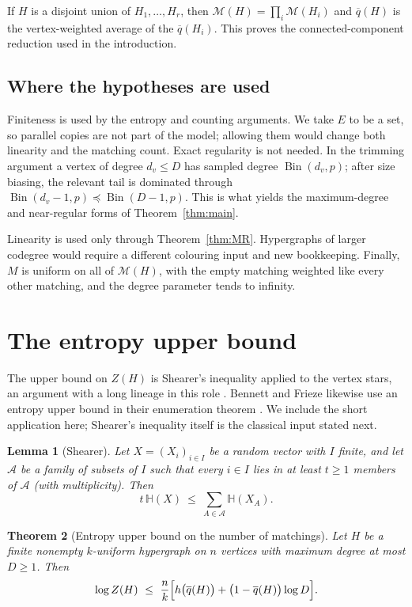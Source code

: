 \documentclass[10pt,a4paper]{amsart}
\newtheorem{theorem}{Theorem}[section]
\newtheorem{lemma}[theorem]{Lemma}
\newcommand{\EE}{E}
\newcommand{\Mat}{\mathcal{M}}
\newcommand{\Ent}{\mathbb{H}}
\newcommand{\qbar}{\overline{q}}
\newcommand{\Bin}{\operatorname{Bin}}
\begin{document}
If $H$ is a disjoint union of $H_1,\ldots,H_r$, then
$\Mat(H)=\prod_i\Mat(H_i)$ and $\qbar(H)$ is the vertex-weighted average of the
$\qbar(H_i)$. This proves the connected-component reduction used in the introduction.

\subsection{Where the hypotheses are used}
\label{subsec:hypotheses}

Finiteness is used by the entropy and counting arguments. We take $\EE$ to be a set, so
parallel copies are not part of the model; allowing them would change both linearity and
the matching count. Exact regularity is not needed. In the trimming argument a vertex of
degree $d_v\le D$ has sampled degree $\Bin(d_v,p)$; after size biasing, the relevant tail is
dominated through $\Bin(d_v-1,p)\preceq\Bin(D-1,p)$. This is what yields the
maximum-degree and near-regular forms of Theorem~\ref{thm:main}.

Linearity is used only through Theorem~\ref{thm:MR}. Hypergraphs of larger codegree would
require a different colouring input and new bookkeeping. Finally, $M$ is uniform on all
of $\Mat(H)$, with the empty matching weighted like every other matching, and the degree
parameter tends to infinity.

\section{The entropy upper bound}
\label{sec:shearer}

The upper bound on $Z(H)$ is Shearer's inequality applied to the vertex stars, an argument
with a long lineage in this role \cite{Shearer,Radhakrishnan,LinialLuria}. Bennett and
Frieze likewise use an entropy upper bound in their enumeration theorem
\cite{BennettFrieze}. We include the short application here; Shearer's inequality itself
is the classical input stated next.

\begin{lemma}[Shearer]
\label{lem:shearer}
Let $X=(X_i)_{i\in I}$ be a random vector with $I$ finite, and let $\mathcal{A}$ be a
family of subsets of $I$ such that every $i\in I$ lies in at least $t\ge 1$ members of
$\mathcal{A}$ (with multiplicity). Then
\[
  t\,\Ent(X)\ \le\ \sum_{A\in\mathcal{A}}\Ent(X_A).
\]
\end{lemma}

\begin{theorem}[Entropy upper bound on the number of matchings]
\label{thm:shearer}
Let $H$ be a finite nonempty $k$-uniform hypergraph on $n$ vertices with maximum degree
at most $D\ge1$.
Then
\[
  \log Z(H)\ \le\ \frac{n}{k}\Bigl[h\bigl(\qbar(H)\bigr)+\bigl(1-\qbar(H)\bigr)\log D\Bigr].
\]
\end{theorem}
\end{document}
